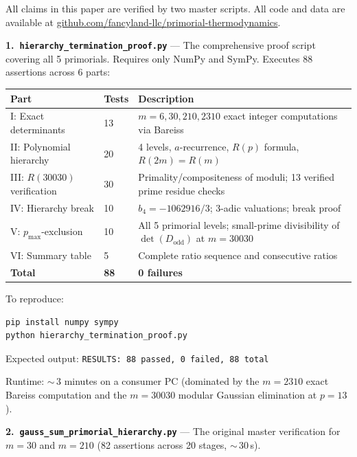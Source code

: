 \documentclass[11pt,letterpaper]{article}
\theoremstyle{definition}
\begin{document}
All claims in this paper are verified by two master scripts.
All code and data are available at \href{https://github.com/fancyland-llc/primorial-thermodynamics}{github.com/fancyland-llc/primorial-thermodynamics}.

\medskip
\textbf{1.\ \texttt{hierarchy\_termination\_proof.py}} --- The comprehensive proof script covering all 5 primorials. Requires only NumPy and SymPy. Executes 88 assertions across 6 parts:

\begin{center}
\begin{tabular}{@{}llp{}@{}}
\toprule
Part & Tests & Description \\
\midrule
I: Exact determinants         & 13 & $m = 6, 30, 210, 2310$ exact integer computations via Bareiss \\
II: Polynomial hierarchy      & 20 & 4 levels, $a$-recurrence, $R(p)$ formula, $R(2m) = R(m)$ \\
III: $R(30030)$ verification  & 30 & Primality/compositeness of moduli; 13 verified prime residue checks \\
IV: Hierarchy break           & 10 & $b_4 = -1062916/3$; 3-adic valuations; break proof \\
V: $p_{\text{max}}$-exclusion & 10 & All 5 primorial levels; small-prime divisibility of $\det(D_{\text{odd}})$ at $m = 30030$ \\
VI: Summary table             & 5  & Complete ratio sequence and consecutive ratios \\
\midrule
\textbf{Total}                & \textbf{88} & \textbf{0 failures} \\
\bottomrule
\end{tabular}
\end{center}

To reproduce:

\begin{verbatim}
pip install numpy sympy
python hierarchy_termination_proof.py
\end{verbatim}

Expected output: \texttt{RESULTS: 88 passed, 0 failed, 88 total}

Runtime: ${\sim}\,3$ minutes on a consumer PC (dominated by the $m = 2310$ exact Bareiss computation and the $m = 30030$ modular Gaussian elimination at $p = 13$).

\medskip
\textbf{2.\ \texttt{gauss\_sum\_primorial\_hierarchy.py}} --- The original master verification for $m = 30$ and $m = 210$ (82 assertions across 20 stages, ${\sim}\,30$\,s).
\end{document}
